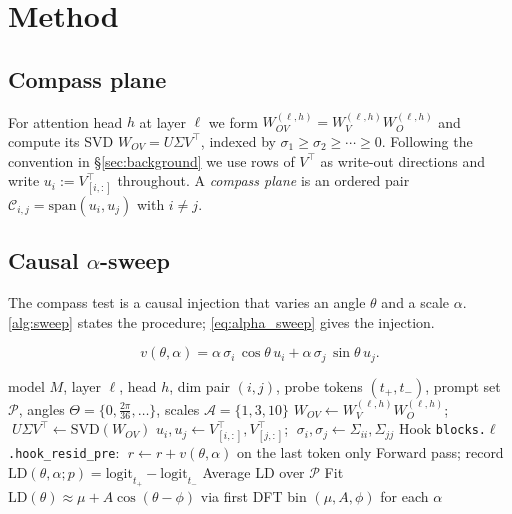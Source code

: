 \section{Method}
\label{sec:method}

\subsection{Compass plane}
\label{sec:method:plane}

For attention head $h$ at layer $\ell$ we form
$W_{OV}^{(\ell,h)} = W_V^{(\ell,h)} W_O^{(\ell,h)}$ and compute its
SVD $W_{OV} = U \Sigma V^\top$, indexed by $\sigma_1 \geq \sigma_2
\geq \cdots \geq 0$. Following the convention in
\S\ref{sec:background} we use rows of $V^\top$ as write-out
directions and write $u_i := V^\top_{[i,:]}$ throughout. A
\emph{compass plane} is an ordered pair
$\mathcal{C}_{i,j} = \mathrm{span}(u_i, u_j)$ with $i \neq j$.

\subsection{Causal $\alpha$-sweep}
\label{sec:method:sweep}

The compass test is a causal injection that varies an angle
$\theta$ and a scale $\alpha$. \cref{alg:sweep} states the
procedure; \cref{eq:alpha_sweep} gives the injection.

\begin{equation}
v(\theta, \alpha) =
  \alpha\,\sigma_i\,\cos\theta\,u_i +
  \alpha\,\sigma_j\,\sin\theta\,u_j.
\label{eq:alpha_sweep}
\end{equation}

\begin{algorithm}[h]
\small
\caption{Causal $\alpha$-sweep on a compass plane.}
\label{alg:sweep}
\begin{algorithmic}[1]
\Require model $M$, layer $\ell$, head $h$, dim pair $(i, j)$,
probe tokens $(t_+, t_-)$, prompt set $\mathcal{P}$,
angles $\Theta = \{0, \tfrac{2\pi}{36}, \dots\}$,
scales $\mathcal{A} = \{1, 3, 10\}$
\State $W_{OV} \gets W_V^{(\ell,h)} W_O^{(\ell,h)}$;
$\;U \Sigma V^\top \gets \mathrm{SVD}(W_{OV})$
\State $u_i, u_j \gets V^\top_{[i,:]}, V^\top_{[j,:]}$;
$\;\sigma_i, \sigma_j \gets \Sigma_{ii}, \Sigma_{jj}$
  \State Hook \texttt{blocks.}$\ell$\texttt{.hook\_resid\_pre}:
         $\;r \gets r + v(\theta, \alpha)$ on the last token only
  \State Forward pass; record
         $\mathrm{LD}(\theta, \alpha; p) = \mathrm{logit}_{t_+} -
          \mathrm{logit}_{t_-}$
\EndFor
\State Average $\mathrm{LD}$ over $\mathcal{P}$
\State Fit $\mathrm{LD}(\theta) \approx \mu + A\cos(\theta - \phi)$
       via first DFT bin
\State \Return $(\mu, A, \phi)$ for each $\alpha$
\end{algorithmic}
\end{algorithm}

